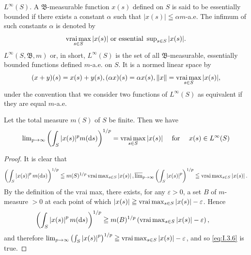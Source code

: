 \begin{example}\label{ex:I.3.Example.3} $L^{\infty}(S)$. A $\mathfrak{B}$-measurable function $x(s)$ defined on $S$ is said to be essentially bounded if there exists a constant $\alpha$ such that $|x(s)| \leqq \alpha m$-a.e. The infimum of such constants $\alpha$ is denoted by 
\[
\operatorname*{vrai\,max}_{s \in S} | x (s) | \text{ or essential } \sup\nolimits_{s \in S} | x (s) |.
\]
$L^{\infty}(S, \mathfrak{B}, m)$ or, in short, $L^{\infty}(S)$ is the set of all $\mathfrak{B}$-measurable, essentially bounded functions defined $m$-a.e. on $S$. It is a normed linear space by 
\[
(x + y) (s) = x (s) + y (s), (\alpha x) (s) = \alpha x (s), \| x \| = \operatorname*{vrai\,max}_{s \in S} | x (s) |,
\]
under the convention that we consider two functions of $L^{\infty}(S)$ as equivalent if they are equal $m$-a.e. 
\end{example}

\begin{theorem}\label{thm:I.3.Theorem.1} Let the total measure $m(S)$ of $S$ be finite. Then we have 
\begin{equation}\label{eq:I.3.6}
\lim\nolimits_{p\rightarrow \infty} \left(\int_{S} | x (s) | ^{p} m (\mathop{}\!\mathrm{d} s)\right) ^{1/p} = \operatorname*{vrai\,max}_{s \in S} | x (s) | \quad \text{ for } \quad x (s) \in L ^{\infty} (S)
\end{equation}
\end{theorem}

\begin{proof}
 It is clear that
\begin{equation}\left(\int\nolimits_{S}\left|x(s)\right|^{p}m(\mathop{}\!\mathrm{d} s)\right)^{1/p} \leqq m(S)^{1/p}\operatorname*{vrai\,max}\nolimits_{s\in S}\left|x(s)\right|, \varlimsup\nolimits_{p\to\infty}\left(\int\nolimits_{S}\left|x(s)\right|^{p}\right)^{1/p} \leqq \operatorname*{vrai\,max}\nolimits_{s\in S}\left|x(s)\right|. \notag\end{equation}
By the definition of the vrai max, there exists, for any $\varepsilon>0$, a set $B$ of $m$-measure $>0$ at each point of which $\left|x(s)\right|\geqq\operatorname*{vrai\,max}\nolimits_{s\in S}\left|x(s)\right|-\varepsilon$. Hence
\begin{align}
\left(\int\nolimits_{S}\left|x(s)\right|^{p}m(\mathop{}\!\mathrm{d} s)\right)^{1/p}& \geqq m(B)^{1/p}\left(\operatorname*{vrai\,max}\nolimits_{s\in S}\left|x(s)\right|-\varepsilon\right), \notag
\end{align}
and therefore $\lim\nolimits_{p\to\infty}\left(\int\nolimits_{S}\left|x(s)\right|^{p}\right)^{1/p}\geqq\operatorname*{vrai\,max}\nolimits_{s\in S}\left|x(s)\right|-\varepsilon$, and so \eqref{eq:I.3.6} is true. 
\end{proof}

